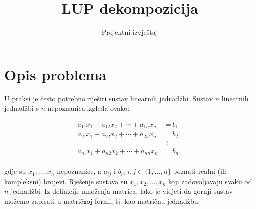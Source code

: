 \documentclass[a4paper,12pt,oneside]{article}
\title{LUP dekompozicija}
\author{ Projektni izvještaj }
\date{}
\begin{document}
	\maketitle
\section*{Opis problema}
U praksi je često potrebno riješiti sustav linearnih jednadžbi. Sustav $n$ linearnih jednadžbi s $n$ nepoznanica izgleda ovako:

\begin{align*}
	a_{11}x_1 + a_{12}x_2 + \cdots + a_{1n}x_n &= b_1 \\
	a_{21}x_1 + a_{22}x_2 + \cdots + a_{2n}x_n &= b_2 \\
											   & \ \ \vdots \\
	a_{n1}x_1 + a_{n2}x_2 + \cdots + a_{nn}x_n &= b_n, \\
\end{align*}

\noindent gdje su $x_1, \dots, x_n$ nepoznanice, a $a_{ij}$ i $b_i$, $i, j \in \{1, \dots, n\}$ poznati realni (ili kompleksni) brojevi. Rješenje sustava su $x_1, x_2, ..., x_n$ koji zadovoljavaju svaku od $n$ jednadžbi.
\newline\newline
\noindent Iz definicije množenja matrica, lako je vidjeti da gornji sustav možemo zapisati u matričnoj formi, tj. kao matričnu jednadžbu:
\end{document}
